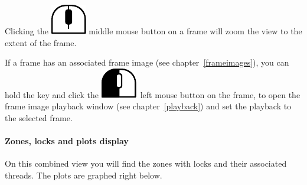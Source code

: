 \documentclass[hidelinks,titlepage,a4paper]{article}
\newcommand{\LMB}{\includegraphics[height=.8\baselineskip]{icons/lmb}}
\newcommand{\MMB}{\includegraphics[height=.8\baselineskip]{icons/mmb}}
\begin{document}
Clicking the \MMB{} middle mouse button on a frame will zoom the view to the extent of the frame.

If a frame has an associated frame image (see chapter~\ref{frameimages}), you can hold the \keys{\ctrl} key and click the \LMB{}~left mouse button on the frame, to open the frame image playback window (see chapter~\ref{playback}) and set the playback to the selected frame.

\paragraph{Zones, locks and plots display}
\label{zoneslocksplots}

On this combined view you will find the zones with locks and their associated threads. The plots are graphed right below.
\end{document}
